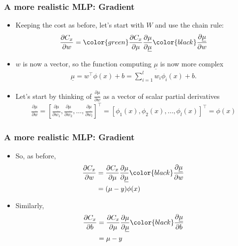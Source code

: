 \documentclass{beamer}
\begin{document}
\begin{frame}
\frametitle{A more realistic MLP: Gradient}

\begin{itemize}
\item Keeping the cost as before, let's start with $W$ and use the chain rule:
\begin{align*}
    \frac{\partial C_x}{\partial w} = \color{green}\frac{\partial C_x}{\partial \mu}
    \frac{\partial \mu}{\partial \underline{\mu}}
    \color{black}\frac{\partial \underline{\mu}}{\partial w}
\end{align*}
\item $w$ is now a vector, so the function computing $\underline{\mu}$ is now more complex
\begin{align*}
    \underline{\mu} = w^\top \phi(x) + b = \sum_{i=1}^l w_i \phi_i(x) + b.
\end{align*}
\item Let's start by thinking of $\frac{\partial \underline{\mu}}{\partial w}$ as a vector of scalar partial derivatives 
\begin{align*}
    \frac{\partial \underline{\mu}}{\partial w} = \left[ 
        \frac{\partial \underline{\mu}}{\partial w_1}, \frac{\partial
        \underline{\mu}}{\partial w_2}, \ldots, \frac{\partial
        \underline{\mu}}{\partial w_l}
    \right]^\top = \left[ \phi_1(x), \phi_2(x), \ldots, \phi_l(x) \right]^\top
    = \phi(x)
\end{align*}
\end{itemize}

\end{frame}


\begin{frame}
\frametitle{A more realistic MLP: Gradient}

\begin{itemize}
\item So, as before,
\begin{align*}
    \frac{\partial C_x}{\partial w} & = \frac{\partial C_x}{\partial \mu}
    \frac{\partial \mu}{\partial \underline{\mu}}
    \color{black}\frac{\partial \underline{\mu}}{\partial w}\\
& = (\mu -y) \phi(x)
\end{align*}
\item Similarly, 
\begin{align*}
    \frac{\partial C_x}{\partial b} & = \frac{\partial C_x}{\partial \mu}
    \frac{\partial \mu}{\partial \underline{\mu}}
    \color{black}\frac{\partial \underline{\mu}}{\partial b}\\
& = \mu -y
\end{align*}
\end{itemize}
\end{frame}
\end{document}
